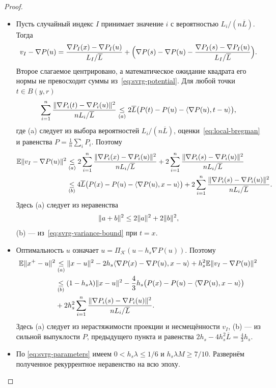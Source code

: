 \begin{proof}
\leavevmode
\begin{itemize}
\item Пусть случайный индекс $I$ принимает значение $i$ с вероятностью
$L_i/(n\overline L)$. Тогда
\[
 v_I-\nabla P(u)
 =\frac{\nabla P_I(x)-\nabla P_I(u)}{L_I/\overline L}
 +\Bigl(\nabla P(s)-\nabla P(u)
 -\frac{\nabla P_I(s)-\nabla P_I(u)}{L_I/\overline L}\Bigr).
\]
Второе слагаемое центрировано, а математическое ожидание квадрата его нормы
не превосходит суммы из~\eqref{eq:svrg-potential}. Для любой точки
$t\in B(y,r)$
\begin{equation}\label{eq:svrg-variance-bound}
 \sum_{i=1}^n\frac{\lVert\nabla P_i(t)-\nabla P_i(u)\rVert^2}{nL_i/\overline L}
 \mathrel{\underset{(a)}{\le}}2\overline L\bigl(P(t)-P(u)-\langle \nabla P(u),t-u\rangle\bigr),
\end{equation}
где (a) следует из выбора вероятностей $L_i/(n\overline L)$, оценки~\eqref{eq:local-bregman}
и равенства $P=\frac1n\sum_iP_i$. Поэтому
\begin{align*}
 \mathbb E\lVert v_I-\nabla P(u)\rVert^2&\mathrel{\underset{(a)}{\le}}2\sum_{i=1}^n\frac{\lVert\nabla P_i(x)-\nabla P_i(u)\rVert^2}{nL_i/\overline L}+2\sum_{i=1}^n\frac{\lVert\nabla P_i(s)-\nabla P_i(u)\rVert^2}{nL_i/\overline L}
 \\&\mathrel{\underset{(b)}{\le}}4\overline L\bigl(P(x)-P(u)-\langle \nabla P(u),x-u\rangle\bigr)
 +2\sum_{i=1}^n\frac{\lVert\nabla P_i(s)-\nabla P_i(u)\rVert^2}{nL_i/\overline L}.
\end{align*}
Здесь (a) следует из неравенства
\[
 \lVert a+b\rVert^2\le2\lVert a\rVert^2+2\lVert b\rVert^2,
\]
(b) --- из~\eqref{eq:svrg-variance-bound} при $t=x$.
\item Оптимальность $u$ означает
$u=\Pi_{\mathcal K}(u-h_s\nabla P(u))$. Поэтому
\begin{align*}
 \mathbb E\lVert x^+-u\rVert^2&\mathrel{\underset{(a)}{\le}}
 \lVert x-u\rVert^2-2h_s\langle \nabla P(x)-\nabla P(u),x-u\rangle
       +h_s^2\mathbb E\lVert v_I-\nabla P(u)\rVert^2
 \\&\mathrel{\underset{(b)}{\le}}
 (1-h_s\lambda)\lVert x-u\rVert^2
 -\frac43h_s\bigl(P(x)-P(u)-\langle \nabla P(u),x-u\rangle\bigr)
 \\&+2h_s^2\sum_{i=1}^n\frac{\lVert\nabla P_i(s)-\nabla P_i(u)\rVert^2}{nL_i/\overline L}.
\end{align*}
Здесь (a) следует из нерастяжимости проекции и несмещённости $v_I$,
(b) --- из сильной выпуклости $P$, предыдущего пункта и равенства
$2h_s-4h_s^2\overline L=\frac43h_s$.
\item По \eqref{eq:svrg-parameters} имеем $0<h_s\lambda\le1/6$
и $h_s\lambda M\ge7/10$. Развернём полученное рекуррентное неравенство на всю эпоху.

\end{itemize}
\end{proof}
